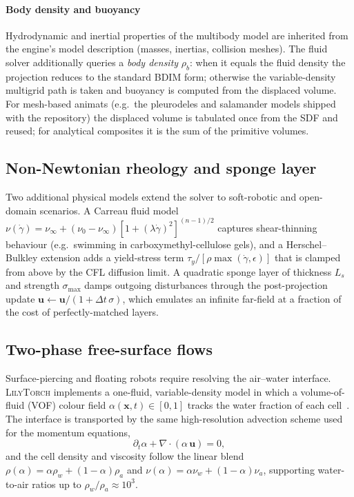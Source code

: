 \documentclass[journal,twoside,10pt]{IEEEtran}
\newcommand{\lilytorch}{\textsc{LilyTorch}\xspace}
\begin{document}
\paragraph{Body density and buoyancy}  Hydrodynamic and inertial
properties of the multibody model are inherited from the engine's model
description (masses, inertias, collision meshes).  The fluid solver additionally
queries a \emph{body density} $\rho_b$: when it equals the fluid
density the projection reduces to the standard BDIM form; otherwise
the variable-density multigrid path is taken and buoyancy is computed
from the displaced volume.  For mesh-based animats (e.g.\ the
pleurodeles and salamander models shipped with the repository) the
displaced volume is tabulated once from the SDF and reused; for
analytical composites it is the sum of the primitive volumes.


\subsection{Non-Newtonian rheology and sponge layer}\label{sec:extras}

Two additional physical models extend the solver to soft-robotic and
open-domain scenarios.  A Carreau fluid
model~\cite{bird1987dynamics}
$\nu(\dot\gamma)=\nu_\infty+(\nu_0-\nu_\infty)[1+(\lambda\dot\gamma)^2]^{(n-1)/2}$
captures shear-thinning behaviour (e.g.\ swimming in
carboxymethyl-cellulose gels), and a Herschel--Bulkley extension
adds a yield-stress term
$\tau_y/[\rho\max(\dot\gamma,\epsilon)]$ that is clamped from above
by the CFL diffusion limit.  A quadratic sponge layer of thickness
$L_s$ and strength $\sigma_\mathrm{max}$ damps outgoing disturbances
through the post-projection update
$\mathbf u\!\leftarrow\!\mathbf u/(1+\Delta t\,\sigma)$, which
emulates an infinite far-field at a fraction of the cost of
perfectly-matched layers.


\subsection{Two-phase free-surface flows}\label{sec:two-phase}

Surface-piercing and floating robots require resolving the air--water
interface.  \lilytorch implements a one-fluid, variable-density model
in which a volume-of-fluid (VOF) colour field
$\alpha(\mathbf x,t)\!\in\![0,1]$ tracks the water fraction of each
cell~\cite{hirt1981volume,harlow1965numerical}.  The interface is
transported by the same high-resolution advection scheme used for the
momentum equations,
\begin{equation}
  \partial_t\alpha+\nabla\!\cdot(\alpha\,\mathbf u)=0,
  \label{eq:vof}
\end{equation}
and the cell density and viscosity follow the linear blend
$\rho(\alpha)=\alpha\rho_w+(1-\alpha)\rho_a$ and
$\nu(\alpha)=\alpha\nu_w+(1-\alpha)\nu_a$, supporting water-to-air
ratios up to $\rho_w/\rho_a\!\approx\!10^3$.
\end{document}

